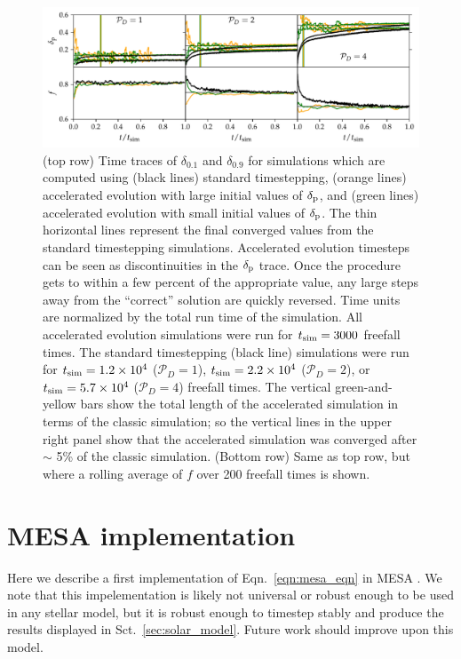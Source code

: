 \documentclass[twocolumn]{aastex631}
\newcommand{\delp}{\ensuremath{\delta_{\rm{p}}}}
\newcommand{\mP}{\ensuremath{\mathcal{P}}}
\begin{document}
\begin{figure}[t]
\centering
\includegraphics[width=\textwidth]{AE_time_figure.pdf}
\caption{
\label{fig:AE_time_figure}
(top row) Time traces of $\delta_{0.1}$ and $\delta_{0.9}$ for simulations which are computed using (black lines) standard timestepping, (orange lines) accelerated evolution with large initial values of $\delp$, and (green lines) accelerated evolution with small initial values of $\delp$.
The thin horizontal lines represent the final converged values from the standard timestepping simulations.
Accelerated evolution timesteps can be seen as discontinuities in the $\delp$ trace.
Once the procedure gets to within a few percent of the appropriate value, any large steps away from the ``correct'' solution are quickly reversed.
Time units are normalized by the total run time of the simulation.
All accelerated evolution simulations were run for $t_{\rm{sim}} = 3000$ freefall times.
The standard timestepping (black line) simulations were run for $t_{\rm{sim}} = 1.2 \times 10^4$ ($\mP_D = 1$), $t_{\rm{sim}} = 2.2 \times 10^4$ ($\mP_D = 2$), or $t_{\rm{sim}} = 5.7 \times 10^4$ ($\mP_D = 4$) freefall times.
The vertical green-and-yellow bars show the total length of the accelerated simulation in terms of the classic simulation; so the vertical lines in the upper right panel show that the accelerated simulation was converged after $\sim$ 5\% of the classic simulation.
(Bottom row) Same as top row, but where a rolling average of $f$ over 200 freefall times is shown.
}
\end{figure}





\section{MESA implementation}
\label{app:mesa}
Here we describe a first implementation of Eqn.~\ref{eqn:mesa_eqn} in MESA \citep{paxton_etal_2011, paxton_etal_2013, paxton_etal_2015, paxton_etal_2018, paxton_etal_2019}.
We note that this impelementation is likely not universal or robust enough to be used in any stellar model, but it is robust enough to timestep stably and produce the results displayed in Sct.~\ref{sec:solar_model}.
Future work should improve upon this model.
\end{document}
